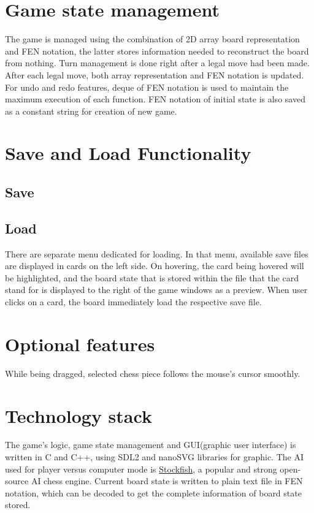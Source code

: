 \documentclass[a4paper, 10pt, titlepage]{report}
\begin{document}
\section{Game state management}
The game is managed using the combination of 2D array board representation and FEN notation, the latter stores information needed to reconstruct the board from nothing. Turn management is done right after a legal move had been made. After each legal move, both array representation and FEN notation is updated. For undo and redo features, deque of FEN notation is used to maintain the maximum execution of each function. FEN notation of initial state is also saved as a constant string for creation of new game.

\section{Save and Load Functionality}
\subsection{Save}

\subsection{Load}
There are separate menu dedicated for loading. In that menu, available save files are displayed in cards on the left side. On hovering, the card being hovered will be highlighted, and the board state that is stored within the file that the card stand for is displayed to the right of the game windows as a preview. When user clicks on a card, the board immediately load the respective save file.
\section{Optional features}
While being dragged, selected chess piece follows the mouse's cursor smoothly.
\section{Technology stack}
The game's logic, game state management and GUI(graphic user interface) is written in C and C++, using SDL2 and nanoSVG libraries for graphic. The AI used for player versus computer mode is \href{https://github.com/official-stockfish/Stockfish}{Stockfish}, a popular and strong open-source AI chess engine. Current board state is written to plain text file in FEN notation, which can be decoded to get the complete information of board state stored.
\end{document}
